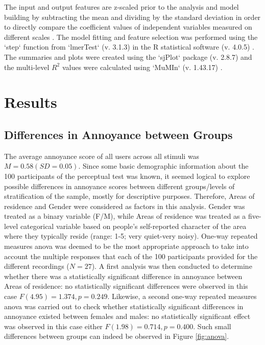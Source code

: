    The input and output features are z-scaled prior to the analysis and model building by subtracting the mean and dividing by the standard deviation in order to directly compare the coefficient values of independent variables measured on different scales . The model fitting and feature selection was performed using the `step` function from `lmerTest` (v. 3.1.3)  in the R statistical software (v. 4.0.5) . The summaries and plots were created using the `sjPlot` package (v. 2.8.7)  and the multi-level $R^2$ values were calculated using `MuMIn` (v. 1.43.17) .


\section{Results}

 \subsection{Differences in Annoyance between Groups}

   The average annoyance score of all users across all stimuli was $M=0.58 (SD=0.05)$. Since some basic demographic information about the 100 participants of the perceptual test was known, it seemed logical to explore possible differences in annoyance scores between different groups/levels of stratification of the sample, mostly for descriptive purposes. Therefore, Areas of residence and Gender were considered as factors in this analysis. Gender was treated as a binary variable (F/M), while Areas of residence was treated as a five-level categorical variable based on people's self-reported character of the area where they typically reside (range: 1-5; very quiet-very noisy). One-way repeated measures \gls{anova} was deemed to be the most appropriate approach to take into account the multiple responses that each of the 100 participants provided for the different recordings ($N=27$). A first analysis was then conducted to determine whether there was a statistically significant difference in annoyance between Areas of residence: no statistically significant differences were observed in this case $F(4.95)=1.374, p=0.249$. Likewise, a second one-way repeated measures \gls{anova} was carried out to check whether statistically significant differences in annoyance existed between females and males: no statistically significant effect was observed in this case either $F(1.98)=0.714, p=0.400$. Such small differences between groups can indeed be observed in Figure \ref{fig:anova}.

